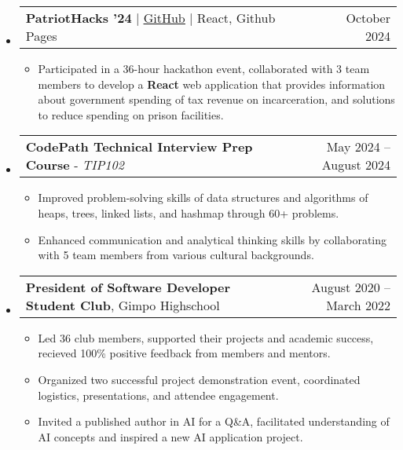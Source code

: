 \documentclass[letterpaper,11pt]{article}
\makeatletter
\newcommand{\resumeItem}[1]{
  \item\small{
    {#1 \vspace{-3pt}}
  }
}
\newcommand{\resumeProjectHeading}[2]{
    \item
    \begin{tabular*}{0.97\textwidth}{l@{\extracolsep{\fill}}r@{\hspace{-0.2in}}}
        \small#1 & \small#2 \\
    \end{tabular*}\vspace{-7pt}
}
\newcommand{\resumeSubHeadingListStart}{\begin{itemize}[leftmargin=0.00in, rightmargin=-0.2in, label={}]}
\newcommand{\resumeSubHeadingListEnd}{\end{itemize}\vspace{-7pt}}
\newcommand{\resumeItemListStart}{\begin{itemize}[leftmargin=0.15in, rightmargin=0.15in]}
\newcommand{\resumeItemListEnd}{\end{itemize}\vspace{-7pt}}
\makeatother
\begin{document}
\resumeSubHeadingListStart
\resumeProjectHeading
{\textbf{PatriotHacks '24} $|$ \href{https://github.com/juhun32/Prison-Break}{\underline{GitHub}} $|$ React, Github Pages}{October 2024}
\resumeItemListStart
\resumeItem{Participated in a 36-hour hackathon event, collaborated with 3 team members to develop a \textbf{React} web application that provides information about government spending of tax revenue on incarceration, and solutions to reduce spending on prison facilities.}
\resumeItemListEnd
\resumeSubHeadingListEnd

\resumeSubHeadingListStart
\resumeProjectHeading
{\textbf{CodePath Technical Interview Prep Course} - \emph{TIP102}}{May 2024 -- August 2024}
\resumeItemListStart
\resumeItem{Improved problem-solving skills of data structures and algorithms of heaps, trees, linked lists, and hashmap through 60+ problems.}
\resumeItem{Enhanced communication and analytical thinking skills by collaborating with 5 team members from various cultural backgrounds.}
\resumeItemListEnd
\resumeSubHeadingListEnd

\resumeSubHeadingListStart
\resumeProjectHeading
{\textbf{President of Software Developer Student Club}, Gimpo Highschool}{August 2020 -- March 2022}
\resumeItemListStart
\resumeItem{Led 36 club members, supported their projects and academic success, recieved 100\% positive feedback from members and mentors.}
\resumeItem{Organized two successful project demonstration event, coordinated logistics, presentations, and attendee engagement.}
\resumeItem{Invited a published author in AI for a Q\&A, facilitated understanding of AI concepts and inspired a new AI application project.}
\resumeItemListEnd
\resumeSubHeadingListEnd
\end{document}
